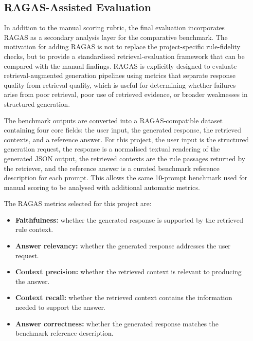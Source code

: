 
\subsection{RAGAS-Assisted Evaluation}

In addition to the manual scoring rubric, the final evaluation incorporates RAGAS as a secondary analysis layer for the comparative benchmark. The motivation for adding RAGAS is not to replace the project-specific rule-fidelity checks, but to provide a standardised retrieval-evaluation framework that can be compared with the manual findings. RAGAS is explicitly designed to evaluate retrieval-augmented generation pipelines using metrics that separate response quality from retrieval quality, which is useful for determining whether failures arise from poor retrieval, poor use of retrieved evidence, or broader weaknesses in structured generation.

The benchmark outputs are converted into a RAGAS-compatible dataset containing four core fields: the user input, the generated response, the retrieved contexts, and a reference answer. For this project, the user input is the structured generation request, the response is a normalised textual rendering of the generated JSON output, the retrieved contexts are the rule passages returned by the retriever, and the reference answer is a curated benchmark reference description for each prompt. This allows the same 10-prompt benchmark used for manual scoring to be analysed with additional automatic metrics.

The RAGAS metrics selected for this project are:
\begin{itemize}
    \item \textbf{Faithfulness:} whether the generated response is supported by the retrieved rule context.
    \item \textbf{Answer relevancy:} whether the generated response addresses the user request.
    \item \textbf{Context precision:} whether the retrieved context is relevant to producing the answer.
    \item \textbf{Context recall:} whether the retrieved context contains the information needed to support the answer.
    \item \textbf{Answer correctness:} whether the generated response matches the benchmark reference description.
\end{itemize}

